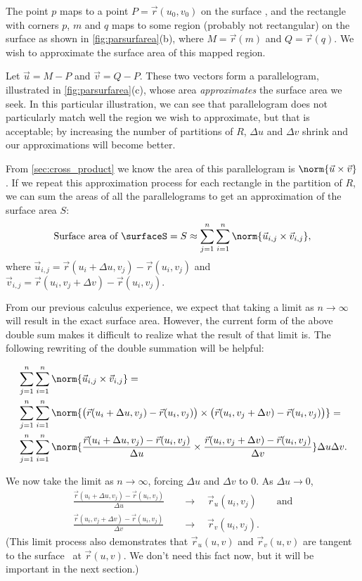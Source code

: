 The point $p$ maps to a point $P = \vec r(u_0,v_0)$ on the surface \surfaceS, and the rectangle with corners $p$, $m$ and $q$ maps to some region (probably not rectangular) on the surface as shown in \autoref{fig:parsurfarea}(b), where $M = \vec r(m)$ and $Q = \vec r(q)$. We wish to approximate the surface area of this mapped region.

Let $\vec u = M-P$ and $\vec v = Q-P$. These two vectors form a parallelogram, illustrated in \autoref{fig:parsurfarea}(c), whose area \emph{approximates} the surface area we seek. In this particular illustration, we can see that parallelogram does not particularly match well the region we wish to approximate, but that is acceptable; by increasing the number of partitions of $R$, $\Delta u$ and $\Delta v$ shrink and our approximations will become better.

From \autoref{sec:cross_product} we know the area of this parallelogram is $\norm{\vec u\times \vec v}$. If we repeat this approximation process for each rectangle in the partition of $R$, we can sum the areas of all the parallelograms to get an approximation of the surface area $S$:
\[
\text{Surface area of \surfaceS} =S
\approx \sum_{j=1}^n\sum_{i=1}^n \norm{\vec u_{i,j}\times \vec v_{i,j}},
\]
where $\vec u_{i,j} = \vec r(u_i+\Delta u,v_j) - \vec r(u_i,v_j)$ and $\vec v_{i,j} = \vec r(u_i,v_j+\Delta v)-\vec r(u_i,v_j)$.

From our previous calculus experience, we expect that taking a limit as $n\to \infty$ will result in the exact surface area. However, the current form of the above double sum makes it difficult to realize what the result of that limit is. The following rewriting of the double summation will be helpful:

\begin{align*}
&\sum_{j=1}^n\sum_{i=1}^n \norm{\vec u_{i,j}\times \vec v_{i,j}}= \\ 
&\sum_{j=1}^n\sum_{i=1}^n \norm{\bigl(\vec r(u_i+\Delta u,v_j) - \vec r(u_i,v_j)\bigr) \times \bigl(\vec r(u_i,v_j+\Delta v)-\vec r(u_i,v_j)\bigr)}= \\
&\sum_{j=1}^n\sum_{i=1}^n \norm{\frac{\vec r(u_i+\Delta u,v_j) - \vec r(u_i,v_j)}{\Delta u} \times \frac{\vec r(u_i,v_j+\Delta v)-\vec r(u_i,v_j)}{\Delta v}}\Delta u\Delta v.
\end{align*}

We now take the limit as $n\to\infty$, forcing $\Delta u$ and $\Delta v$ to 0. As $\Delta u\to 0$,
\begin{align*}
\frac{\vec r(u_i+\Delta u,v_j) - \vec r(u_i,v_j)}{\Delta u}\quad
&\to\quad \vec r_u(u_i,v_j)\qquad \text{and}\\
\frac{\vec r(u_i,v_j+\Delta v)-\vec r(u_i,v_j)}{\Delta v}\quad
&\to\quad \vec r_v(u_i,v_j).
\end{align*}
(This limit process also demonstrates that $\vec r_u(u,v)$ and $\vec r_v(u,v)$ are tangent to the surface \surfaceS\ at $\vec r(u,v)$. We don't need this fact now, but it will be important in the next section.)

